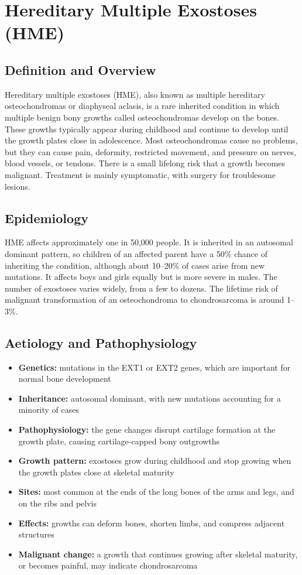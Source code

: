 \chapter{Hereditary Multiple Exostoses (HME)}

\section*{Definition and Overview}
Hereditary multiple exostoses (HME), also known as multiple hereditary osteochondromas or diaphyseal aclasis, is a rare inherited condition in which multiple benign bony growths called osteochondromas develop on the bones. These growths typically appear during childhood and continue to develop until the growth plates close in adolescence. Most osteochondromas cause no problems, but they can cause pain, deformity, restricted movement, and pressure on nerves, blood vessels, or tendons. There is a small lifelong risk that a growth becomes malignant. Treatment is mainly symptomatic, with surgery for troublesome lesions.

\section*{Epidemiology}
HME affects approximately one in 50,000 people. It is inherited in an autosomal dominant pattern, so children of an affected parent have a 50\% chance of inheriting the condition, although about 10--20\% of cases arise from new mutations. It affects boys and girls equally but is more severe in males. The number of exostoses varies widely, from a few to dozens. The lifetime risk of malignant transformation of an osteochondroma to chondrosarcoma is around 1--3\%.

\section*{Aetiology and Pathophysiology}
\begin{itemize}
    \item \textbf{Genetics:} mutations in the EXT1 or EXT2 genes, which are important for normal bone development
    \item \textbf{Inheritance:} autosomal dominant, with new mutations accounting for a minority of cases
    \item \textbf{Pathophysiology:} the gene changes disrupt cartilage formation at the growth plate, causing cartilage-capped bony outgrowths
    \item \textbf{Growth pattern:} exostoses grow during childhood and stop growing when the growth plates close at skeletal maturity
    \item \textbf{Sites:} most common at the ends of the long bones of the arms and legs, and on the ribs and pelvis
    \item \textbf{Effects:} growths can deform bones, shorten limbs, and compress adjacent structures
    \item \textbf{Malignant change:} a growth that continues growing after skeletal maturity, or becomes painful, may indicate chondrosarcoma
\end{itemize}

